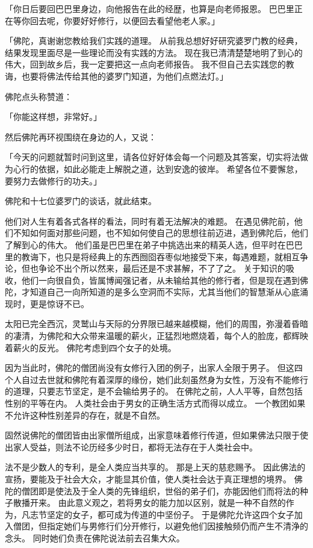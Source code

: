 \documentclass[twoside,openany]{book}
\begin{document}
「你日后要回巴巴里身边，向他报告在此的经歴，也算是向老师报恩。
巴巴里正在等你回去呢，你要好好修行，以便回去看望他老人家。」

「佛陀，真谢谢您教给我们实践的道理。
从前我总想好好研究婆罗门教的经典，结果发现里面尽是一些理论而没有实践的方法。
现在我已清清楚楚地明了到心的伟大，回到故乡后，我一定要把这一点向老师报告。
我不但自己去实践您的教诲，也要将佛法传给其他的婆罗门知道，为他们点燃法灯。」

佛陀点头称赞道：

「你能这样想，非常好。」

然后佛陀再环视围绕在身边的人，又说：

「今天的问题就暂时问到这里，请各位好好体会每一个问题及其答案，切实将法做为心行的依据，如此必能走上解脱之道，达到安逸的彼岸。
希望各位不要懈怠，要努力去做修行的功夫。」

佛陀和十七位婆罗门的谈话，就此结束。

他们对人生有着各式各样的看法，同时有着无法解决的难题。
在遇见佛陀前，他们不知如何面对那些问题，也不知如何使自己的思想往前迈进，遇到佛陀后，他们了解到心的伟大。
他们虽是巴巴里在弟子中挑选出来的精英人选，但平时在巴巴里的教诲下，也只是将经典上的东西囫囵吞枣似地接受下来，每遇难题，就相互争论，但也争论不出个所以然来，最后还是不求甚解，不了了之。
关于知识的吸收，他们一向很自负，皆属博闻强记者，从未输给其他的修行者，但是现在遇到佛陀，才知道自己一向所知道的是多么空洞而不实际，尤其当他们的智慧渐从心底涌现时，更是惊讶不已。

太阳已完全西沉，灵鹫山与天际的分界限已越来越模糊，他们的周围，弥漫着昏暗的凄清，为佛陀和大众带来温暖的薪火，正猛烈地燃烧着，每个人的脸庞，都辉映着薪火的反光。
佛陀考虑到四个女子的处境。

因为当此时，佛陀的僧团尚没有女修行入团的例子，出家人全限于男子。
但这四个人自过去世就和佛陀有着深厚的缘份，她们此刻虽然身为女性，万没有不能修行的道理，只要志节坚定，是不会输给男子的。
在佛陀之前，人人平等，自然包括性别的平等在内。
人类社会由于男女的正确生活方式而得以成立。
一个教团如果不允许这种性别差异的存在，就是不自然。

固然说佛陀的僧团皆由出家僧所组成，出家意味着修行传道，但如果佛法只限于使出家人受益，则法不论历经多少时日，都将无法存在于人类社会中。

法不是少数人的专利，是全人类应当共享的。
那是上天的慈悲赐予。
因此佛法的宣扬，要能及于社会大众，才能显其价值，使人类社会达于真正理想的境界。
佛陀的僧团即是使法及于全人类的先锋组织，世俗的弟子们，亦能因他们而将法的种子散播开来。
由此意义观之，若将男女的能力加以区别，就是一种不自然的作为，凡志节坚定的女子，都可成为传道的中坚份子。
于是佛陀允许这四个女子加入僧团，但指定她们与男修行们分开修行，以避免他们因接触频仍而产生不清浄的念头。
同时她们负责在佛陀说法前去召集大众。
\end{document}
